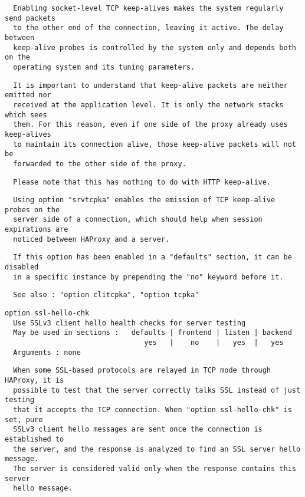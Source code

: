 \begin{verbatim}
  Enabling socket-level TCP keep-alives makes the system regularly send packets
  to the other end of the connection, leaving it active. The delay between
  keep-alive probes is controlled by the system only and depends both on the
  operating system and its tuning parameters.
\end{verbatim}

\begin{verbatim}
  It is important to understand that keep-alive packets are neither emitted nor
  received at the application level. It is only the network stacks which sees
  them. For this reason, even if one side of the proxy already uses keep-alives
  to maintain its connection alive, those keep-alive packets will not be
  forwarded to the other side of the proxy.
\end{verbatim}

\begin{verbatim}
  Please note that this has nothing to do with HTTP keep-alive.
\end{verbatim}

\begin{verbatim}
  Using option "srvtcpka" enables the emission of TCP keep-alive probes on the
  server side of a connection, which should help when session expirations are
  noticed between HAProxy and a server.
\end{verbatim}

\begin{verbatim}
  If this option has been enabled in a "defaults" section, it can be disabled
  in a specific instance by prepending the "no" keyword before it.
\end{verbatim}

\begin{verbatim}
  See also : "option clitcpka", "option tcpka"
\end{verbatim}

\begin{verbatim}
option ssl-hello-chk
  Use SSLv3 client hello health checks for server testing
  May be used in sections :   defaults | frontend | listen | backend
                                 yes   |    no    |   yes  |   yes
  Arguments : none
\end{verbatim}

\begin{verbatim}
  When some SSL-based protocols are relayed in TCP mode through HAProxy, it is
  possible to test that the server correctly talks SSL instead of just testing
  that it accepts the TCP connection. When "option ssl-hello-chk" is set, pure
  SSLv3 client hello messages are sent once the connection is established to
  the server, and the response is analyzed to find an SSL server hello message.
  The server is considered valid only when the response contains this server
  hello message.
\end{verbatim}

